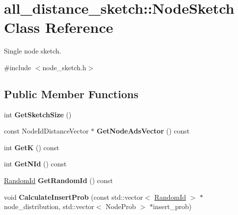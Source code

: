 \hypertarget{classall__distance__sketch_1_1NodeSketch}{}\section{all\+\_\+distance\+\_\+sketch\+:\+:Node\+Sketch Class Reference}
\label{classall__distance__sketch_1_1NodeSketch}


Single node sketch.  




{\ttfamily \#include $<$node\+\_\+sketch.\+h$>$}

\subsection*{Public Member Functions}
\begin{DoxyCompactItemize}
\item 
\hypertarget{classall__distance__sketch_1_1NodeSketch_ad7a0937c7470108e2a62b00288c1f7de}{}int {\bfseries Get\+Sketch\+Size} ()\label{classall__distance__sketch_1_1NodeSketch_ad7a0937c7470108e2a62b00288c1f7de}

\item 
\hypertarget{classall__distance__sketch_1_1NodeSketch_ac2200cc2ae91ab7745d4b3151229bfe3}{}const Node\+Id\+Distance\+Vector $\ast$ {\bfseries Get\+Node\+Ads\+Vector} () const \label{classall__distance__sketch_1_1NodeSketch_ac2200cc2ae91ab7745d4b3151229bfe3}

\item 
\hypertarget{classall__distance__sketch_1_1NodeSketch_af55cb9bdc148cba0c2bb35a8e101b6e9}{}int {\bfseries Get\+K} () const \label{classall__distance__sketch_1_1NodeSketch_af55cb9bdc148cba0c2bb35a8e101b6e9}

\item 
\hypertarget{classall__distance__sketch_1_1NodeSketch_a15156f70b8b148d4706ce13c3db5ead7}{}int {\bfseries Get\+N\+Id} () const \label{classall__distance__sketch_1_1NodeSketch_a15156f70b8b148d4706ce13c3db5ead7}

\item 
\hypertarget{classall__distance__sketch_1_1NodeSketch_a75e3d722870d4ff73e6943484a4ab62e}{}\hyperlink{namespaceall__distance__sketch_a07dc7ca615a83c4e656f52297eda4bb4}{Random\+Id} {\bfseries Get\+Random\+Id} () const \label{classall__distance__sketch_1_1NodeSketch_a75e3d722870d4ff73e6943484a4ab62e}

\item 
\hypertarget{classall__distance__sketch_1_1NodeSketch_a2596a7734b00e9807f1d4e1cbfe2dcaf}{}void {\bfseries Calculate\+Insert\+Prob} (const std\+::vector$<$ \hyperlink{namespaceall__distance__sketch_a07dc7ca615a83c4e656f52297eda4bb4}{Random\+Id} $>$ $\ast$node\+\_\+distribution, std\+::vector$<$ Node\+Prob $>$ $\ast$insert\+\_\+prob)\label{classall__distance__sketch_1_1NodeSketch_a2596a7734b00e9807f1d4e1cbfe2dcaf}

\end{DoxyCompactItemize}
